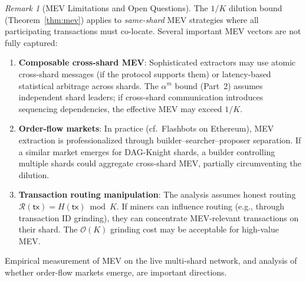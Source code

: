 \documentclass[11pt,a4paper]{article}
\theoremstyle{definition}
\theoremstyle{remark}
\newtheorem{remark}[theorem]{Remark}
\newcommand{\DK}{\textsf{DAG-Knight}}
\newcommand{\bigO}{\mathcal{O}}
\begin{document}
\begin{remark}[MEV Limitations and Open Questions]\label{rem:mev-limitations}
The $1/K$ dilution bound (Theorem~\ref{thm:mev}) applies to
\emph{same-shard} MEV strategies where all participating transactions
must co-locate.
Several important MEV vectors are not fully captured:
\begin{enumerate}[label=(\roman*),nosep]
  \item \textbf{Composable cross-shard MEV}: Sophisticated extractors may
    use atomic cross-shard messages (if the protocol supports them) or
    latency-based statistical arbitrage across shards.
    The $\alpha^m$ bound (Part~2) assumes independent shard leaders; if
    cross-shard communication introduces sequencing dependencies, the
    effective MEV may exceed $1/K$.
  \item \textbf{Order-flow markets}: In practice (cf.\ Flashbots on
    Ethereum), MEV extraction is professionalized through
    builder--searcher--proposer separation.
    If a similar market emerges for \DK{} shards, a builder controlling
    multiple shards could aggregate cross-shard MEV, partially
    circumventing the dilution.
  \item \textbf{Transaction routing manipulation}: The analysis assumes
    honest routing $\mathcal{R}(\mathsf{tx}) = H(\mathsf{tx}) \bmod K$.
    If miners can influence routing (e.g., through transaction ID
    grinding), they can concentrate MEV-relevant transactions on their
    shard.
    The $\bigO(K)$ grinding cost may be acceptable for high-value MEV.
\end{enumerate}
Empirical measurement of MEV on the live multi-shard network, and
analysis of whether order-flow markets emerge, are important directions.
\end{remark}
\end{document}

